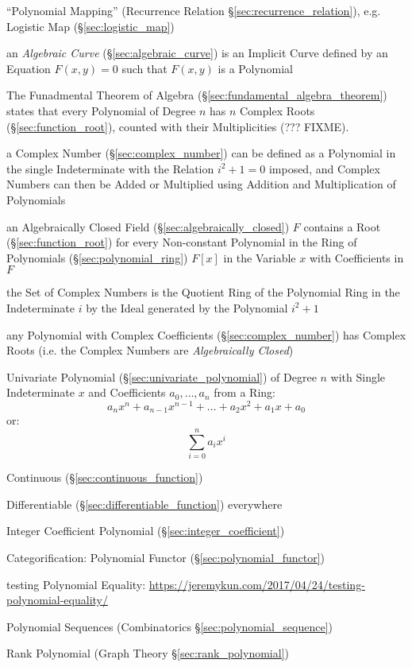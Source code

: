 \fist ``Polynomial Mapping'' (Recurrence Relation
\S\ref{sec:recurrence_relation}), e.g. Logistic Map (\S\ref{sec:logistic_map})

\fist an \emph{Algebraic Curve} (\S\ref{sec:algebraic_curve}) is an Implicit
Curve defined by an Equation $F(x,y) = 0$ such that $F(x,y)$ is a Polynomial

The Funadmental Theorem of Algebra (\S\ref{sec:fundamental_algebra_theorem})
states that every Polynomial of Degree $n$ has $n$ Complex Roots
(\S\ref{sec:function_root}), counted with their Multiplicities (??? FIXME).

a Complex Number (\S\ref{sec:complex_number}) can be defined as a Polynomial in
the single Indeterminate with the Relation $i^2 + 1 = 0$ imposed, and Complex
Numbers can then be Added or Multiplied using Addition and Multiplication of
Polynomials

an Algebraically Closed Field (\S\ref{sec:algebraically_closed}) $F$ contains a
Root (\S\ref{sec:function_root}) for every Non-constant Polynomial in the Ring
of Polynomials (\S\ref{sec:polynomial_ring}) $F[x]$ in the Variable $x$ with
Coefficients in $F$

the Set of Complex Numbers is the Quotient Ring of the Polynomial Ring in the
Indeterminate $i$ by the Ideal generated by the Polynomial $i^2 + 1$

any Polynomial with Complex Coefficients (\S\ref{sec:complex_number}) has
Complex Roots (i.e. the Complex Numbers are \emph{Algebraically Closed})

Univariate Polynomial (\S\ref{sec:univariate_polynomial}) of Degree
$n$ with Single Indeterminate $x$ and Coefficients $a_0, \ldots, a_n$
from a Ring:
\[
  a_n x^n + a_{n-1} x^{n-1} + \ldots + a_2 x^2 + a_1 x + a_0
\]
or:
\[
  \sum_{i=0}^n a_i x^i
\]

Continuous (\S\ref{sec:continuous_function})

Differentiable (\S\ref{sec:differentiable_function}) everywhere

Integer Coefficient Polynomial (\S\ref{sec:integer_coefficient})

Categorification: Polynomial Functor (\S\ref{sec:polynomial_functor})

testing Polynomial Equality:
\url{https://jeremykun.com/2017/04/24/testing-polynomial-equality/}

\fist Polynomial Sequences (Combinatorics \S\ref{sec:polynomial_sequence})

\fist Rank Polynomial (Graph Theory \S\ref{sec:rank_polynomial})

